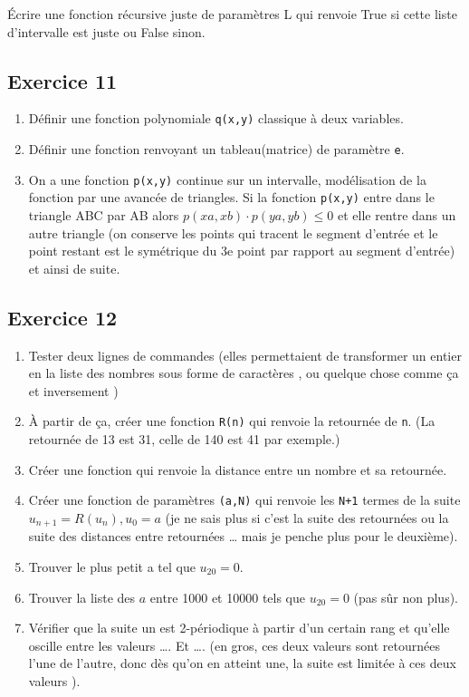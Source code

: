 \documentclass[10pt,fleqn]{article} %
\begin{document}
\begin{multicols}{2}
\begin{enumerate}
Écrire une fonction récursive juste de paramètres L qui renvoie True si cette liste d'intervalle est juste ou False sinon.
\end{enumerate}


\subsection*{Exercice 11}

\begin{enumerate}
\item Définir une fonction polynomiale \texttt{q(x,y)} classique à deux variables.
\item Définir une fonction renvoyant un tableau(matrice) de paramètre \texttt{e}.
\item On a une fonction \texttt{p(x,y)} continue sur un intervalle, modélisation de la fonction par une avancée de triangles. Si la fonction \texttt{p(x,y)} entre dans le triangle ABC par AB alors $p(xa,xb)\cdot p(ya,yb)\leq 0$ et elle rentre dans un autre triangle (on conserve les points qui tracent le segment d'entrée et le point restant est le symétrique du 3e point par rapport au segment d'entrée) et ainsi de suite.
\end{enumerate}


\subsection*{Exercice 12}

\begin{enumerate}
\item Tester deux lignes de commandes (elles permettaient de transformer un entier en la liste des nombres sous forme de caractères , ou quelque chose comme ça et inversement )  
\item À partir de ça, créer une fonction \texttt{R(n)} qui renvoie la retournée de \texttt{n}. (La retournée de 13 est 31, celle de 140 est 41 par exemple.)
\item Créer une fonction qui renvoie la distance entre un nombre et sa retournée.
\item Créer une fonction de paramètres \texttt{(a,N)} qui renvoie les \texttt{N+1} termes de la suite $u_{n+1}=R(u_n), u_0=a$    (je ne sais plus si c’est la suite des retournées ou la suite des distances entre retournées … mais je penche plus pour le deuxième).
\item Trouver le plus petit a tel que $u_{20}= 0$.
\item Trouver la liste des $a$ entre 1000 et 10000 tels que $u_{20}= 0$ (pas sûr non plus).
\item Vérifier que la suite un est 2-périodique à partir d’un certain rang et qu’elle oscille entre les valeurs …. Et …. (en gros, ces deux valeurs sont retournées l’une de l’autre, donc dès qu’on en atteint une, la suite est limitée à ces deux valeurs ).
\end{enumerate}


\end{multicols}
\end{document}

